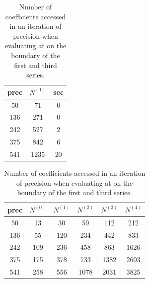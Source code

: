 		\begin{table}[h]
			 \centering
			\begin{subtable}{0.48\textwidth}
				\centering
			  	\begin{tabular}{|c|c|c|}
			  	\hline
			  	prec & $N^{(1)}$ & sec \\
			  	\hline
			  	50 & 71 & 0\\
			  	\hline
			  	136 & 271 & 0\\
			  	\hline
			  	242 & 527 & 2\\
			  	\hline
			  	375 & 842 & 6\\
			  	\hline
			  	541 & 1235 & 20\\
			  	\hline
			  	\end{tabular}
			  	\caption{evaluating at series 1}
		  	\end{subtable}
			\begin{subtable}{0.48\textwidth}
				\centering
			  	\begin{tabular}{|c|c|c|c|c|c|}
			  	\hline
			  	prec & $N^{(0)}$ & $N^{(1)}$ &$N^{(2)}$ & $N^{(3)}$ & $N^{(4)}$ \\
			  	\hline
			  	50 & 13 & 30 & 59 & 112 & 212\\
			  	\hline
			  	136 & 55 & 120 & 234 & 442 & 833\\
			  	\hline
			  	242 & 109 & 236 & 458 & 863 & 1626\\
			  	\hline
			  	375 & 175 & 378 & 733 & 1382 & 2603\\
			  	\hline
			  	541 & 258 & 556 & 1078 & 2031 & 3825\\
			  	\hline
			  	\end{tabular}
			  	\caption{evaluating at series 3}
		  	\end{subtable}
			\caption{Number of coefficients accessed in an \irram iteration of precision \sprec when evaluating at on the boundary of the first and third series.}
			\label{fig:xinv coeff 0 dep on n}
		\end{table}

